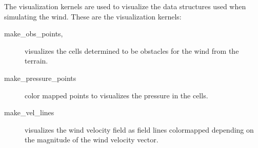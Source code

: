 The visualization kernels are used to visualize the data structures used when 
simulating the wind. These are the visualization kernels:

\begin{description}
	\item[make\_obs\_points,] visualizes the cells determined to be obstacles 
	for the wind from the terrain. 
	\item[make\_pressure\_points] color mapped points to visualizes the pressure 
	in the cells. 
	\item[make\_vel\_lines] visualizes the wind velocity field as field lines 
	colormapped depending on the magnitude of the wind velocity vector. 
\end{description}


